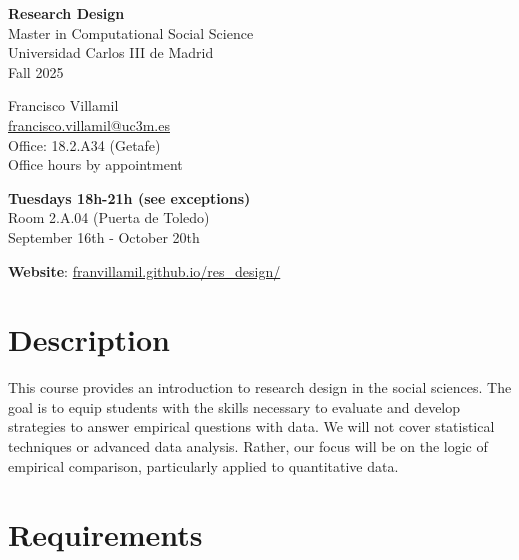 \documentclass[12pt, a4paper]{article}
\begin{document}
\begin{center}
{\LARGE\bf Research Design}\\\vspace{10pt}
Master in Computational Social Science\\
Universidad Carlos III de Madrid\\\vspace{10pt}
{\large Fall 2025}\\
\end{center}

\vspace{20pt}

\begin{minipage}{0.49\textwidth}
\centering
Francisco Villamil\\
\href{francisco.villamil@uc3m.es}{francisco.villamil@uc3m.es}\\
Office: 18.2.A34 (Getafe)\\
Office hours by appointment
\end{minipage}\hfill
\begin{minipage}{0.49\textwidth}
\centering
\textbf{Tuesdays 18h-21h (see exceptions)}\\Room 2.A.04 (Puerta de Toledo)\\September 16th - October 20th\\
\end{minipage}

\vspace{20pt}
\begin{center}
\textbf{Website}: \href{https://franvillamil.github.io/res_design/}{franvillamil.github.io/res\_design/}\\
\end{center}


\vspace{10pt}
\section{Description}

This course provides an introduction to research design in the social sciences.
The goal is to equip students with the skills necessary to evaluate and develop strategies to answer empirical questions with data.
We will not cover statistical techniques or advanced data analysis.
Rather, our focus will be on the logic of empirical comparison, particularly applied to quantitative data.

\section{Requirements}
\end{document}
